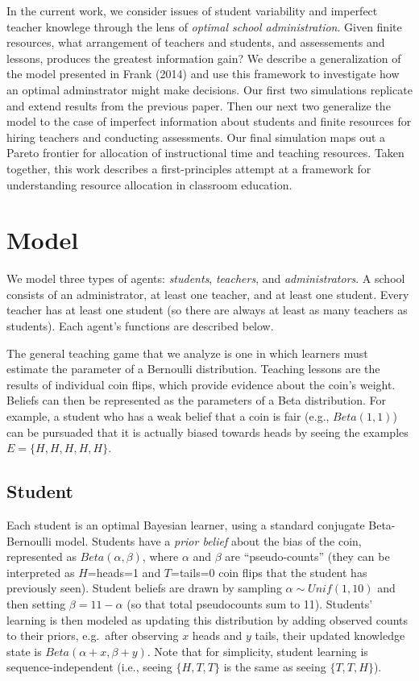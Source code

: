 \documentclass[10pt, letterpaper]{article}
\begin{document}
In the current work, we consider issues of student variability and
imperfect teacher knowlege through the lens of \emph{optimal school
administration}. Given finite resources, what arrangement of teachers
and students, and assessements and lessons, produces the greatest
information gain? We describe a generalization of the model presented in
Frank (2014) and use this framework to investigate how an optimal
adminstrator might make decisions. Our first two simulations replicate
and extend results from the previous paper. Then our next two generalize
the model to the case of imperfect information about students and finite
resources for hiring teachers and conducting assessments. Our final
simulation maps out a Pareto frontier for allocation of instructional
time and teaching resources. Taken together, this work describes a
first-principles attempt at a framework for understanding resource
allocation in classroom education.

\section{Model}\label{model}

We model three types of agents: \emph{students}, \emph{teachers}, and
\emph{administrators}. A school consists of an administrator, at least
one teacher, and at least one student. Every teacher has at least one
student (so there are always at least as many teachers as students).
Each agent's functions are described below.

The general teaching game that we analyze is one in which learners must
estimate the parameter of a Bernoulli distribution. Teaching lessons are
the results of individual coin flips, which provide evidence about the
coin's weight. Beliefs can then be represented as the parameters of a
Beta distribution. For example, a student who has a weak belief that a
coin is fair (e.g., \(Beta(1,1)\)) can be pursuaded that it is actually
biased towards heads by seeing the examples \(E = \{H, H, H, H, H\}\).

\subsection{Student}\label{student}

Each student is an optimal Bayesian learner, using a standard conjugate
Beta-Bernoulli model. Students have a \emph{prior belief} about the bias
of the coin, represented as \(Beta(\alpha,\beta)\), where \(\alpha\) and
\(\beta\) are ``pseudo-counts'' (they can be interpreted as
\(H\)=heads=1 and \(T\)=tails=0 coin flips that the student has
previously seen). Student beliefs are drawn by sampling
\(\alpha \sim Unif(1,10)\) and then setting \(\beta = 11 - \alpha\) (so
that total pseudocounts sum to 11). Students' learning is then modeled
as updating this distribution by adding observed counts to their priors,
e.g.~after observing \(x\) heads and \(y\) tails, their updated
knowledge state is \(Beta(\alpha + x, \beta + y)\). Note that for
simplicity, student learning is sequence-independent (i.e., seeing
\(\{H, T, T\}\) is the same as seeing \(\{T, T, H\}\)).
\end{document}
